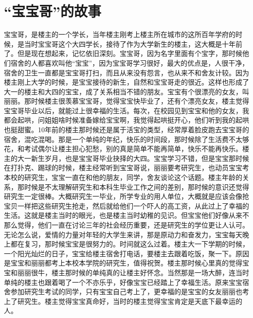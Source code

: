 \section{“宝宝哥”的故事}

宝宝哥，是楼主的一个学长，当年楼主刚考上楼主所在城市的这所百年学府的时候，是当时宝宝哥这个大四学长，接待了作为大学新生的楼主，这大概是十年前了。但是现在想起来，记忆依旧深刻。宝宝哥，因为名字里面有个宝字，那时候他们宿舍的人都喜欢叫他“宝宝”，因为宝宝哥学习很好，最大的优点是，人很干净，宿舍的卫生一直都是宝宝哥打扫，而且从来没有怨言，也从来不和舍友计较。因为楼主刚上大学的时候，是宝宝接待的新生，自然和宝宝哥走的很近。这样也形成了大一的楼主和大四的宝宝，成了关系相当不错的朋友。宝宝有个很漂亮的女友，叫丽丽。那时候楼主很羡慕宝宝哥，觉得宝宝快毕业了，还有个漂亮女友，楼主觉得宝宝哥毕业以后，就能过上很幸福的生活。每次，在校园见到宝宝和他的女友，我都会起哄，问姐姐啥时候准备嫁给宝宝啊，我觉得起哄挺开心，他们听到我的起哄也挺甜蜜。10年前的楼主那时候还是属于活宝的类型，经常厚着脸皮跑去宝宝哥的宿舍，混吃混喝。那是一个单纯的年纪，快乐的时间段，那时候除了生活费不太够花，和考试偶尔让楼主担心犯愁，别的真是简单不能再简单，快乐不能再快乐。楼主的大一新生岁月，也是宝宝哥毕业抉择的大四。宝宝学习不错，但是宝宝那时候在打扑克、踢球的时候，楼主经常听到宝宝哥说，丽丽要考研究生，也动员宝宝考本校的研究生，宝宝一直在和他的朋友，同学，舍友谈论这个话题。楼主年龄的关系，那时候是不太理解研究生和本科生毕业工作之间的差别，那时候的意识还觉得研究生一定很棒。大概研究生一毕业，所学专业的用人单位，大概就是应该会像抢宝贝一样把这些研究生抢走，然后就给他们一个吓人的高工资，从此过上了幸福的生活。这就是楼主当时的眼光，也是楼主当时幼稚的见识。但宝宝他们好像从来不那么觉得，他们一直在讨论三年的社会经历重要，还是研究生的学位更让人认可。无论怎么说，爱情的力量对年轻的大学生来讲，那是原动力和奋发力，宝宝每天晚上都在复习，那时候宝宝是很努力的。时间就这么过着。楼主大一下学期的时候，一个阳光灿烂的日子，宝宝给楼主宿舍打电话，要楼主去跟着吃饭，聚一下。原因是宝宝和丽丽都考上本校本学院的研究生，值得祝贺。楼主那时候心里真的觉得宝宝和丽丽很牛，楼主那时候的单纯真的让楼主好怀念。当然那是一场大醉，连当时单纯的楼主也跟着喝了一个不亦乐乎，好像宝宝已经踏上了幸福生活。原来宝宝宿舍参加研究生考试的同学，只有宝宝自己考上了，更幸福的是宝宝的女友丽丽也考上了研究生。楼主觉得宝宝真命好，当时的楼主觉得宝宝肯定是天底下最幸运的人。

